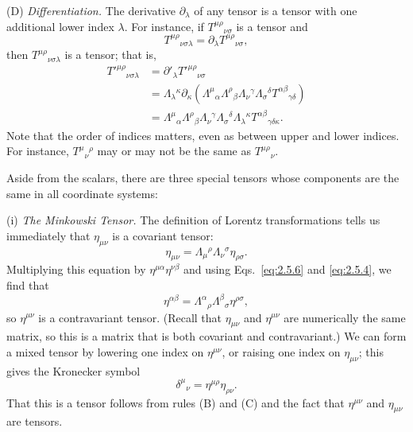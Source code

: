 \noindent(D) \emph{Differentiation.} The derivative \(\partial_\lambda\) of
any tensor is a tensor with one additional lower index \(\lambda\). For
instance, if \(T^{\mu\rho}{}_{\nu\sigma}\) is a tensor and
\[
  T^{\mu\rho}{}_{\nu\sigma\lambda}
  =\partial_\lambda T^{\mu\rho}{}_{\nu\sigma},
\]
then \(T^{\mu\rho}{}_{\nu\sigma\lambda}\) is a tensor; that is,
\[
\begin{aligned}
  T'^{\mu\rho}{}_{\nu\sigma\lambda}
  &=\partial'_\lambda T'^{\mu\rho}{}_{\nu\sigma}\\
  &=\Lambda_\lambda{}^\kappa\partial_\kappa
    \left(
      \Lambda^\mu{}_\alpha\Lambda^\rho{}_\beta
      \Lambda_\nu{}^\gamma\Lambda_\sigma{}^\delta
      T^{\alpha\beta}{}_{\gamma\delta}
    \right)\\
  &=\Lambda^\mu{}_\alpha\Lambda^\rho{}_\beta
    \Lambda_\nu{}^\gamma\Lambda_\sigma{}^\delta
    \Lambda_\lambda{}^\kappa
    T^{\alpha\beta}{}_{\gamma\delta\kappa}.
\end{aligned}
\]
Note that the order of indices matters, even as between upper and lower
indices. For instance, \(T^\mu{}_\nu{}^\rho\) may or may not be the same as
\(T^{\mu\rho}{}_\nu\).

Aside from the scalars, there are three special tensors whose components are
the same in all coordinate systems:

\noindent(i) \emph{The Minkowski Tensor.} The definition of Lorentz
transformations tells us immediately that \(\eta_{\mu\nu}\) is a covariant
tensor:
\[
  \eta_{\mu\nu}
  =\Lambda_\mu{}^\rho\Lambda_\nu{}^\sigma\eta_{\rho\sigma}.
\]
Multiplying this equation by \(\eta^{\mu\alpha}\eta^{\nu\beta}\) and using
Eqs.~\eqref{eq:2.5.6} and \eqref{eq:2.5.4}, we find that
\[
  \eta^{\alpha\beta}
  =\Lambda^\alpha{}_\rho\Lambda^\beta{}_\sigma\eta^{\rho\sigma},
\]
so \(\eta^{\mu\nu}\) is a contravariant tensor. (Recall that
\(\eta_{\mu\nu}\) and \(\eta^{\mu\nu}\) are numerically the same matrix, so
this is a matrix that is both covariant and contravariant.) We can form a mixed
tensor by lowering one index on \(\eta^{\mu\nu}\), or raising one index on
\(\eta_{\mu\nu}\); this gives the Kronecker symbol
\[
  \delta^\mu{}_\nu=\eta^{\mu\rho}\eta_{\rho\nu}.
\]
That this is a tensor follows from rules (B) and (C) and the fact that
\(\eta^{\mu\nu}\) and \(\eta_{\mu\nu}\) are tensors.

